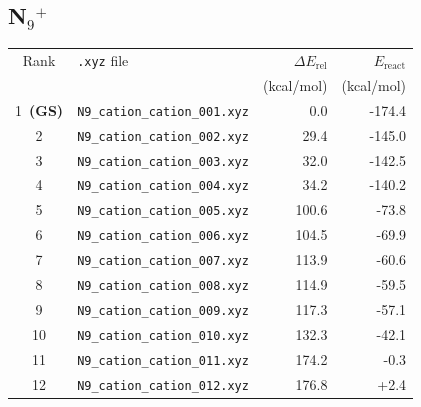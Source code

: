 \documentclass[11pt,a4paper]{article}
\begin{document}
\subsection*{N$_{9}$$^{+}$}
\begin{longtable}{clrr}
\toprule
Rank & \texttt{.xyz} file & $\Delta E_\text{rel}$ & $E_\text{react}$ \\
 & & (kcal/mol) & (kcal/mol) \\
\midrule\endhead
\rowcolor{gs}1~\textbf{(GS)} & \texttt{N9\_cation\_cation\_001.xyz} & 0.0 & -174.4 \\
2 & \texttt{N9\_cation\_cation\_002.xyz} & 29.4 & -145.0 \\
3 & \texttt{N9\_cation\_cation\_003.xyz} & 32.0 & -142.5 \\
4 & \texttt{N9\_cation\_cation\_004.xyz} & 34.2 & -140.2 \\
5 & \texttt{N9\_cation\_cation\_005.xyz} & 100.6 & -73.8 \\
6 & \texttt{N9\_cation\_cation\_006.xyz} & 104.5 & -69.9 \\
7 & \texttt{N9\_cation\_cation\_007.xyz} & 113.9 & -60.6 \\
8 & \texttt{N9\_cation\_cation\_008.xyz} & 114.9 & -59.5 \\
9 & \texttt{N9\_cation\_cation\_009.xyz} & 117.3 & -57.1 \\
10 & \texttt{N9\_cation\_cation\_010.xyz} & 132.3 & -42.1 \\
11 & \texttt{N9\_cation\_cation\_011.xyz} & 174.2 & -0.3 \\
12 & \texttt{N9\_cation\_cation\_012.xyz} & 176.8 & +2.4 \\
\bottomrule
\end{longtable}
\end{document}
